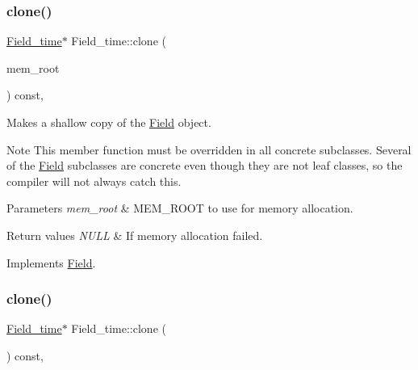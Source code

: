 \subsubsection{\texorpdfstring{clone()}{clone()}\hspace{0.1cm}{\footnotesize\ttfamily [1/2]}}
{\footnotesize\ttfamily \mbox{\hyperlink{classField__time}{Field\+\_\+time}}$\ast$ Field\+\_\+time\+::clone (\begin{DoxyParamCaption}\item[{M\+E\+M\+\_\+\+R\+O\+OT $\ast$}]{mem\+\_\+root }\end{DoxyParamCaption}) const\hspace{0.3cm}{\ttfamily [inline]}, {\ttfamily [virtual]}}

Makes a shallow copy of the \mbox{\hyperlink{classField}{Field}} object.

\begin{DoxyNote}{Note}
This member function must be overridden in all concrete subclasses. Several of the \mbox{\hyperlink{classField}{Field}} subclasses are concrete even though they are not leaf classes, so the compiler will not always catch this.
\end{DoxyNote}

\begin{DoxyParams}{Parameters}
{\em mem\+\_\+root} & M\+E\+M\+\_\+\+R\+O\+OT to use for memory allocation. \\
\hline
\end{DoxyParams}

\begin{DoxyRetVals}{Return values}
{\em N\+U\+LL} & If memory allocation failed. \\
\hline
\end{DoxyRetVals}


Implements \mbox{\hyperlink{classField_a64979bcb9345803b031fff76a0c3d9fe}{Field}}.

\mbox{\label{classField__time_a0def829c440ce9d2066056c865476d29}} 
\subsubsection{\texorpdfstring{clone()}{clone()}\hspace{0.1cm}{\footnotesize\ttfamily [2/2]}}
{\footnotesize\ttfamily \mbox{\hyperlink{classField__time}{Field\+\_\+time}}$\ast$ Field\+\_\+time\+::clone (\begin{DoxyParamCaption}{ }\end{DoxyParamCaption}) const\hspace{0.3cm}{\ttfamily [inline]}, {\ttfamily [virtual]}}


